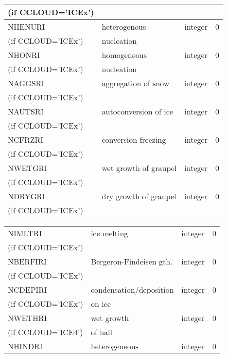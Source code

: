 \begin{center}
\begin{tabular} {|p{8cm}|p{4cm}|>{\centering}p{1.5cm}|p{1.5cm}<{\centering}|}
(if CCLOUD='ICEx') & &   &  \\\hline
NHENURI  & heterogenous   & integer  &  0 \index{NHENURI!\innam{NAM\_BU\_RRI}}\\
(if CCLOUD='ICEx') &nucleation &   &  \\\hline
NHONRI  & homogeneous   & integer  &  0 \index{NHONRI!\innam{NAM\_BU\_RRI}}\\
(if CCLOUD='ICEx') &nucleation &   &  \\\hline
NAGGSRI & aggregation of snow & integer  &  0 \index{NAGGSRI!\innam{NAM\_BU\_RRI}}\\
(if CCLOUD='ICEx') & &   &  \\\hline
NAUTSRI & autoconversion of ice & integer  &  0 \index{NAUTSRI!\innam{NAM\_BU\_RRI}}\\
(if CCLOUD='ICEx') & &   &  \\\hline
NCFRZRI &   conversion freezing  & integer  &  0 \index{NCFRZRI!\innam{NAM\_BU\_RRI}}\\
(if CCLOUD='ICEx') & &   &  \\\hline
NWETGRI &   wet growth of graupel & integer  &  0 \index{NWETGRI!\innam{NAM\_BU\_RRI}}\\
(if CCLOUD='ICEx') & &   &  \\\hline
NDRYGRI &   dry growth of graupel & integer  &  0 \index{NDRYGRI!\innam{NAM\_BU\_RRI}}\\
(if CCLOUD='ICEx') & &   &  \\\hline
\end{tabular}
\begin{tabular} {|p{8cm}|p{4cm}|>{\centering}p{1.5cm}|p{1.5cm}<{\centering}|}
\hline
NIMLTRI &   ice melting & integer  &  0 \index{NIMLRI!\innam{NAM\_BU\_RRI}}\\
(if CCLOUD='ICEx') & &   &  \\\hline
NBERFIRI&   Bergeron-Findeisen gth. & integer  &  0 \index{NBERFIRI!\innam{NAM\_BU\_RRI}}\\
(if CCLOUD='ICEx') & &   &  \\\hline
NCDEPIRI&   condensation/deposition & integer  &  0 \index{NCDEPIRI!\innam{NAM\_BU\_RRI}}\\
(if CCLOUD='ICEx') &  on ice&   &  \\\hline
NWETHRI &   wet growth  & integer  &  0 \index{NWETHRI!\innam{NAM\_BU\_RRI}}\\
(if CCLOUD='ICE4') &of hail &   &  \\\hline
NHINDRI &  heterogeneous     & integer  &  0 \index{NHINDRI!\innam{NAM\_BU\_RRI}}\\

\end{tabular}
\end{center}
